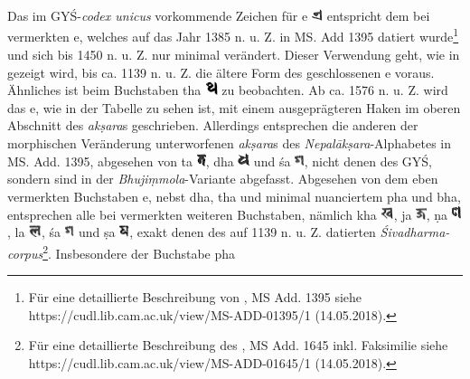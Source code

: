\documentclass[a4paper,12pt]{article}
\begin{document}
{Das im GYŚ-\textit{codex unicus} vorkommende Zeichen für e \includegraphics[height=4.0mm]{paleo_e.png} entspricht dem bei \parencite[233]{bendall1992} vermerkten e, welches auf das Jahr 1385 n. u. Z. in MS. Add 1395 datiert wurde\footnote{\raggedright{Für eine detaillierte Beschreibung von \textcite{pancaraksa}, MS Add. 1395 siehe https://cudl.lib.cam.ac.uk/view/MS-ADD-01395/1 (14.05.2018).}} und sich bis 1450 n. u. Z. nur minimal verändert. Dieser Verwendung geht, wie in \parencite[233]{bendall1992} gezeigt wird, bis ca. 1139 n. u. Z. die ältere Form des geschlossenen e voraus. Ähnliches ist beim Buchstaben tha \includegraphics[height=4.0mm]{paleo_th.png} zu beobachten. Ab ca. 1576 n. u. Z. wird das e, wie in der Tabelle zu sehen ist, mit einem ausgeprägteren Haken im oberen Abschnitt des \textit{akṣara}s geschrieben. Allerdings entsprechen die anderen der morphischen Veränderung unterworfenen \textit{akṣara}s des \textit{Nepalākṣara}-Alphabetes in MS. Add. 1395, abgesehen von ta \includegraphics[height=4.0mm]{paleo_ta.png}, dha \includegraphics[height=4.0mm]{paleo_dh.png} und śa \includegraphics[height=4.0mm]{paleo_sh.png}, nicht denen des GYŚ, sondern sind in der \textit{Bhujiṃmola}-Variante abgefasst. Abgesehen von dem eben vermerkten Buchstaben e, nebst dha, tha und minimal nuanciertem pha und bha, entsprechen alle bei \parencite[233]{bendall1992} vermerkten weiteren Buchstaben, nämlich kha \includegraphics[height=4.0mm]{paleo_kh.png}, ja \includegraphics[height=4.0mm]{paleo_ja.png}, ṇa \includegraphics[height=4.0mm]{paleo_nna.png}, la \includegraphics[height=4.0mm]{paleo_la.png}, śa \includegraphics[height=4.0mm]{paleo_sh.png} und ṣa \includegraphics[height=4.0mm]{paleo_ssa.png}, exakt denen des auf 1139 n. u. Z. datierten \textit{Śivadharma-corpus}\footnote{\raggedright{Für eine detaillierte Beschreibung des \textcite{sivadharma}, MS Add. 1645 inkl. Faksimilie siehe https://cudl.lib.cam.ac.uk/view/MS-ADD-01645/1 (14.05.2018).}}. Insbesondere der Buchstabe pha }
\end{document}
